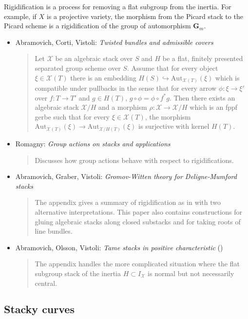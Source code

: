 \noindent
Rigidification is a process for removing a flat subgroup from the inertia.
For example, if $X$ is a projective variety, the morphism from the Picard
stack to the Picard scheme is a rigidification of the group of automorphism
$\mathbf{G}_m$.
\begin{itemize}
\item Abramovich, Corti, Vistoli:
\emph{Twisted bundles and admissible covers} \cite{acv}
\begin{quote}
Let $\mathcal{X}$ be an algebraic stack over $S$ and $H$ be a flat, finitely
presented separated group scheme over $S$. Assume that for every object
$\xi \in \mathcal{X}(T)$ there is an embedding
$H(S) \hookrightarrow \text{Aut}_{\mathcal{X}(T)}(\xi)$ which is compatible
under pullbacks in the sense that for every arrow $\phi : \xi \rightarrow \xi'$
over $f: T \rightarrow T'$ and $g \in H(T)$, $g \circ \phi = \phi \circ f^*g$.
Then there exists an algebraic stack $\mathcal{X}/H$ and a
morphism $\rho : \mathcal{X} \rightarrow \mathcal{X}/H$ which is
an fppf gerbe such that for every $\xi \in \mathcal{X}(T)$, the morphism
$\text{Aut}_{\mathcal{X}(T)} (\xi)
\rightarrow \text{Aut}_{\mathcal{X}/H (T)} (\xi) $
is surjective with kernel $H(T)$.
\end{quote}
\item Romagny: \emph{Group actions on stacks and applications}
\cite{romagny_actions}
\begin{quote}
Discusses how group actions behave with respect to rigidifications.
\end{quote}
\item Abramovich, Graber, Vistoli:
\emph{Gromov-Witten theory for Deligne-Mumford stacks} \cite{agv}
\begin{quote}
The appendix gives a summary of rigidification as in \cite{acv} with two
alternative interpretations. This paper also contains constructions for
gluing algebraic stacks along closed substacks and for taking roots of line
bundles.
\end{quote}
\item
Abramovich, Olsson, Vistoli: \emph{Tame stacks in positive characteristic}
(\cite{tame})
\begin{quote}
The appendix handles the more complicated situation where the flat subgroup
stack of the inertia $H \subset I_\mathcal{X}$ is normal but not
necessarily central.
\end{quote}
\end{itemize}

\subsection{Stacky curves}
\label{subsection-stacky-curves}

